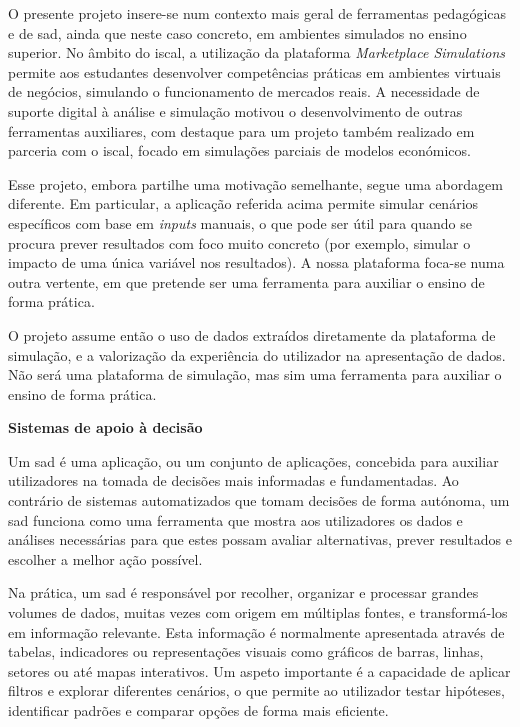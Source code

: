 O presente projeto insere-se num contexto mais geral de ferramentas pedagógicas e de \gls{sad}, ainda que neste caso concreto, em ambientes simulados no ensino superior. No âmbito do \gls{iscal}, a utilização da plataforma \textit{Marketplace Simulations} \cite{MarketplaceSim_2025} permite aos estudantes desenvolver competências práticas em ambientes virtuais de negócios, simulando o funcionamento de mercados reais. A necessidade de suporte digital à análise e simulação motivou o desenvolvimento de outras ferramentas auxiliares, com destaque para um projeto também realizado em parceria com o \gls{iscal}, focado em simulações parciais de modelos económicos.

Esse projeto, embora partilhe uma motivação semelhante, segue uma abordagem diferente. Em particular, a aplicação referida acima permite simular cenários específicos com base em \textit{inputs} manuais, o que pode ser útil para quando se procura prever resultados com foco muito concreto (por exemplo, simular o impacto de uma única variável nos resultados). A nossa plataforma foca-se numa outra vertente, em que pretende ser uma ferramenta para auxiliar o ensino de forma prática.

O projeto assume então o uso de dados extraídos diretamente da plataforma de simulação, e a valorização da experiência do utilizador na apresentação de dados. Não será uma plataforma de simulação, mas sim uma ferramenta para auxiliar o ensino de forma prática.

\textbf{Sistemas de apoio à decisão}
\label{sec:sad}

Um \gls{sad} é uma aplicação, ou um conjunto de aplicações, concebida para auxiliar utilizadores na tomada de decisões mais informadas e fundamentadas. Ao contrário de sistemas automatizados que tomam decisões de forma autónoma, um \gls{sad} funciona como uma ferramenta que mostra aos utilizadores os dados e análises necessárias para que estes possam avaliar alternativas, prever resultados e escolher a melhor ação possível.

Na prática, um \gls{sad} é responsável por recolher, organizar e processar grandes volumes de dados, muitas vezes com origem em múltiplas fontes, e transformá-los em informação relevante. Esta informação é normalmente apresentada através de tabelas, indicadores ou representações visuais como gráficos de barras, linhas, setores ou até mapas interativos. Um aspeto importante é a capacidade de aplicar filtros e explorar diferentes cenários, o que permite ao utilizador testar hipóteses, identificar padrões e comparar opções de forma mais eficiente.

